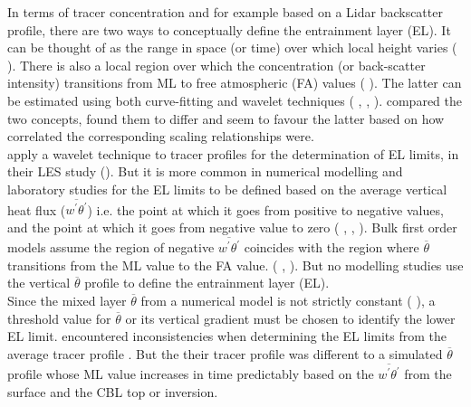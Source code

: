 In terms of tracer concentration and for example based on a Lidar backscatter profile, there are two ways to conceptually
define the entrainment layer (\acs{EL}).  It can be thought of as the range in space (or time) over which local height
varies (\citeauthor{CrumStullEl} \cite{CrumStullEl}).  There is also a local region over which the concentration (or back-scatter intensity) transitions from \acs{ML} to free atmospheric (\acs{FA}) values (\citeauthor{Traum11} \cite{Traum11}).  The latter
can be estimated using both curve-fitting and wavelet techniques (\citeauthor{Traum11} \cite{Traum11}, \citeauthor{SteynBaldHoff} 
\cite{SteynBaldHoff}, \citeauthor{BrooksFowler2} \cite{BrooksFowler2}). \citeauthor{Traum11} \cite{Traum11} compared the
two concepts, found them to differ and seem to favour the latter based on how correlated the corresponding scaling relationships were.\\

\citeauthor{BrooksFowler2} apply a wavelet technique to tracer profiles for the determination of 
\acs{EL} limits, in their \acs{LES} study (\cite{BrooksFowler2}).  But it is more common in numerical modelling and laboratory studies
for the \acs{EL} limits to be defined based on the average vertical heat flux ($\overline{w^{'}\theta^{'}}$) i.e. the point
at which it goes from positive to negative values, and the point at which it goes from negative value to zero (\citeauthor{DearWill80} \cite{DearWill80}, \citeauthor{FedConzMir04} \cite{FedConzMir04}, \citeauthor{GarciaMellado} \cite{GarciaMellado}). Bulk first order models assume
the region of negative $\overline{w^{'}\theta^{'}}$ coincides with the region where $\overline{\theta}$
transitions from the \acs{ML} value to the \acs{FA} value. (\citeauthor{Deardorff79} \cite{Deardorff79}, 
\cite{FedConzMir04} \cite{FedConzMir04}).  But no modelling studies use the vertical $\overline{\theta}$ profile to define 
the entrainment layer (\acs{EL}).\\

Since the mixed layer $\overline{\theta}$ from a numerical model is not strictly constant (\citeauthor{FedConzMir04} 
\cite{FedConzMir04}), a threshold value for $\overline{\theta}$ or its vertical gradient must be chosen to identify the lower 
\acs{EL} limit.  \citeauthor{BrooksFowler2} encountered inconsistencies when determining the \acs{EL} limits from the average 
tracer profile \cite{BrooksFowler2}.  But the their tracer profile was different to a simulated $\overline{\theta}$ profile whose 
\acs{ML} value increases in time predictably based on the $\overline{w^{'}\theta^{'}}$ from the surface and the \acs{CBL} top or inversion.             

